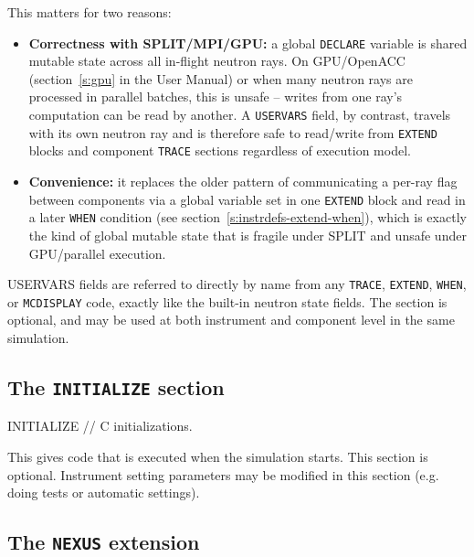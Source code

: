 This matters for two reasons:
\begin{itemize}
\item \textbf{Correctness with SPLIT/MPI/GPU:} a global \texttt{DECLARE}
  variable is shared mutable state across all in-flight neutron rays. On
  GPU/OpenACC (section~\ref{s:gpu} in the User Manual) or when many
  neutron rays are processed in parallel batches, this is unsafe --
  writes from one ray's computation can be read by another. A
  \texttt{USERVARS} field, by contrast, travels with its own neutron ray
  and is therefore safe to read/write from \texttt{EXTEND} blocks and
  component \texttt{TRACE} sections regardless of execution model.
\item \textbf{Convenience:} it replaces the older pattern of communicating
  a per-ray flag between components via a global variable set in one
  \texttt{EXTEND} block and read in a later \texttt{WHEN} condition (see
  section~\ref{s:instrdefs-extend-when}), which is exactly the kind of
  global mutable state that is fragile under SPLIT and unsafe under
  GPU/parallel execution.
\end{itemize}

USERVARS fields are referred to directly by name from any \texttt{TRACE},
\texttt{EXTEND}, \texttt{WHEN}, or \texttt{MCDISPLAY} code, exactly like the
built-in neutron state fields. The section is optional, and may be used at
both instrument and component level in the same simulation.

\subsection{The \texttt{INITIALIZE} section}
\label{s:initialize}

\begin{mcstas}
INITIALIZE
// C initializations. 
\end{mcstas} 
This gives code that is executed when the
simulation starts. This section is optional. Instrument setting parameters may
be modified in this section (e.g. doing tests or automatic settings).

\subsection{The \texttt{NEXUS} extension}
\label{s:nexus}

